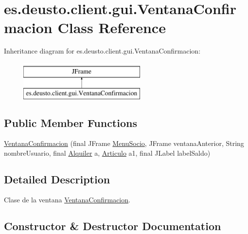\hypertarget{classes_1_1deusto_1_1client_1_1gui_1_1_ventana_confirmacion}{}\section{es.\+deusto.\+client.\+gui.\+Ventana\+Confirmacion Class Reference}
\label{classes_1_1deusto_1_1client_1_1gui_1_1_ventana_confirmacion}
Inheritance diagram for es.\+deusto.\+client.\+gui.\+Ventana\+Confirmacion\+:\begin{figure}[H]
\begin{center}
\leavevmode
\includegraphics[height=2.000000cm]{classes_1_1deusto_1_1client_1_1gui_1_1_ventana_confirmacion}
\end{center}
\end{figure}
\subsection*{Public Member Functions}
\begin{DoxyCompactItemize}
\item 
\mbox{\hyperlink{classes_1_1deusto_1_1client_1_1gui_1_1_ventana_confirmacion_ac85621502fabfb535fc902b601796aeb}{Ventana\+Confirmacion}} (final J\+Frame \mbox{\hyperlink{classes_1_1deusto_1_1client_1_1gui_1_1_menu_socio}{Menu\+Socio}}, J\+Frame ventana\+Anterior, String nombre\+Usuario, final \mbox{\hyperlink{classes_1_1deusto_1_1client_1_1data_1_1_alquiler}{Alquiler}} a, \mbox{\hyperlink{classes_1_1deusto_1_1client_1_1data_1_1_articulo}{Articulo}} a1, final J\+Label label\+Saldo)
\end{DoxyCompactItemize}


\subsection{Detailed Description}
Clase de la ventana \mbox{\hyperlink{classes_1_1deusto_1_1client_1_1gui_1_1_ventana_confirmacion}{Ventana\+Confirmacion}}. 

\subsection{Constructor \& Destructor Documentation}
\mbox{\label{classes_1_1deusto_1_1client_1_1gui_1_1_ventana_confirmacion_ac85621502fabfb535fc902b601796aeb}} 
